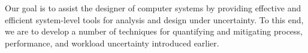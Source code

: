 Our goal is to assist the designer of computer systems by providing effective
and efficient system-level tools for analysis and design under uncertainty. To
this end, we are to develop a number of techniques for quantifying and
mitigating process, performance, and workload uncertainty introduced earlier.
